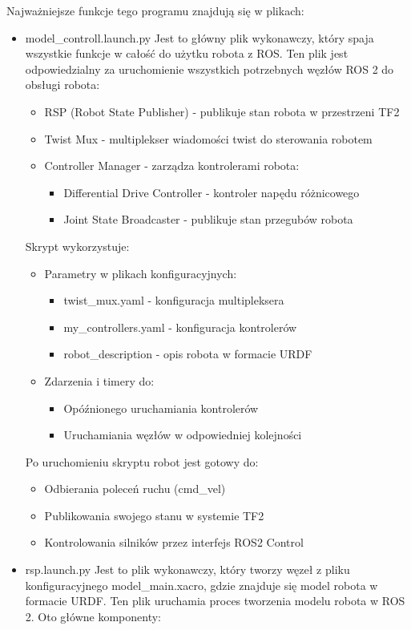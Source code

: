 \documentclass[a4paper,twoside,12pt]{book}
\begin{document}
Najważniejsze funkcje tego programu znajdują się w plikach:
\begin{itemize}
	\item model\_controll.launch.py
	Jest to główny plik wykonawczy, który spaja wszystkie funkcje w całość do użytku robota z ROS.
	Ten plik jest odpowiedzialny za uruchomienie wszystkich potrzebnych węzłów ROS 2 do obsługi robota:

	\begin{itemize}
		\item RSP (Robot State Publisher) - publikuje stan robota w przestrzeni TF2
		\item Twist Mux - multiplekser wiadomości twist do sterowania robotem
		\item Controller Manager - zarządza kontrolerami robota:
			\begin{itemize}
				\item Differential Drive Controller - kontroler napędu różnicowego
				\item Joint State Broadcaster - publikuje stan przegubów robota
			\end{itemize}
	\end{itemize}

	Skrypt wykorzystuje:
	\begin{itemize}
		\item Parametry w plikach konfiguracyjnych:
			\begin{itemize}
				\item twist\_mux.yaml - konfiguracja multipleksera
				\item my\_controllers.yaml - konfiguracja kontrolerów
				\item robot\_description - opis robota w formacie URDF
			\end{itemize}
		\item Zdarzenia i timery do:
			\begin{itemize}
				\item Opóźnionego uruchamiania kontrolerów
				\item Uruchamiania węzłów w odpowiedniej kolejności
			\end{itemize}
	\end{itemize}

	Po uruchomieniu skryptu robot jest gotowy do:
	\begin{itemize}
		\item Odbierania poleceń ruchu (cmd\_vel)
		\item Publikowania swojego stanu w systemie TF2
		\item Kontrolowania silników przez interfejs ROS2 Control
	\end{itemize}
	\newpage
	\item rsp.launch.py
	Jest to plik wykonawczy, który tworzy węzeł z pliku konfiguracyjnego model\_main.xacro, gdzie znajduje się model robota w formacie URDF.
	Ten plik uruchamia proces tworzenia modelu robota w ROS 2. Oto główne komponenty:


\end{itemize}
\end{document}
